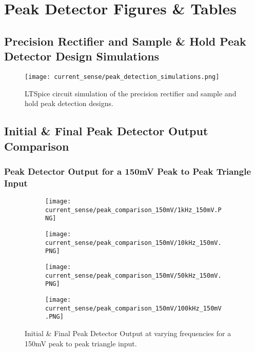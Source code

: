 \chapter{Peak Detector Figures \& Tables}\label{A:peak_detector}

\section*{Precision Rectifier and Sample \& Hold Peak Detector Design Simulations}

\begin{figure}[H]
    \begin{center}
        \texttt{[image: current\_sense/peak\_detection\_simulations.png]}
        \caption{LTSpice circuit simulation of the precision rectifier and sample and hold peak detection designs.}
    \end{center}
    \vspace{-20pt}
\end{figure}

\section*{Initial \& Final Peak Detector Output Comparison}\label{A:peak_detector_screenshots}

\subsection*{Peak Detector Output for a 150mV Peak to Peak Triangle Input}
\begin{figure}[H]
    
    \centering
    \begin{subfigure}{0.45\textwidth}
        \texttt{[image: current\_sense/peak\_comparison\_150mV/1kHz\_150mV.PNG]}
    \end{subfigure}
    \begin{subfigure}{0.45\textwidth}
        \texttt{[image: current\_sense/peak\_comparison\_150mV/10kHz\_150mV.PNG]}
    \end{subfigure}
    \begin{subfigure}{0.45\textwidth}
        \texttt{[image: current\_sense/peak\_comparison\_150mV/50kHz\_150mV.PNG]}
    \end{subfigure}
    \begin{subfigure}{0.45\textwidth}
        \texttt{[image: current\_sense/peak\_comparison\_150mV/100kHz\_150mV.PNG]}
    \end{subfigure}
    \caption{Initial \& Final Peak Detector Output at varying frequencies for a 150mV peak to peak triangle input.}
\end{figure}

